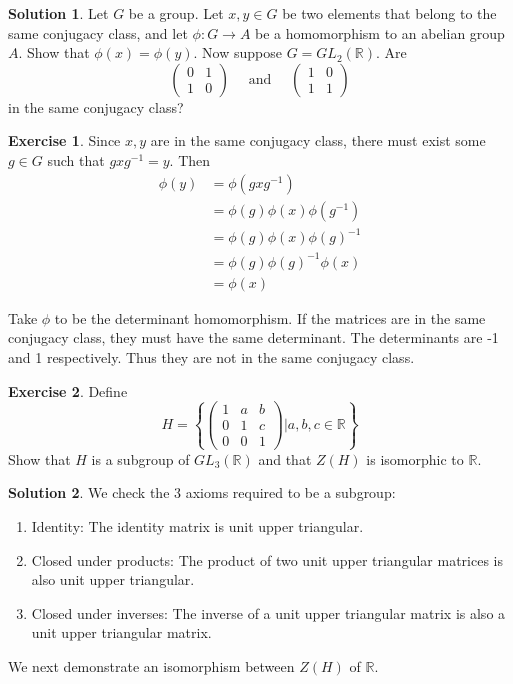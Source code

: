 \documentclass[12pt]{article}
\theoremstyle{definition}
\newcommand{\R}{\mathbb{R}}
\newtheorem{exercise}{\color{YellowOrange}Exercise}
\theoremstyle{definition}
\newtheorem{solution}{\color{Goldenrod}Solution}
\begin{document}
\begin{solution}
	Let $G$ be a group. Let $x,y \in G$ be two elements that belong to the same conjugacy class, and let $\phi : G \to A$ be a homomorphism to an abelian group $A$. Show that $\phi(x) = \phi(y)$. Now suppose $G = GL_2(\R)$. Are 
	\begin{equation}
		\begin{pmatrix}
		0 & 1 \\
		1 & 0
		\end{pmatrix}
		\quad
		\text{ and } 
		\quad 
		\begin{pmatrix}
		1 & 0 \\
		1 & 1
		\end{pmatrix}
	\end{equation}
	in the same conjugacy class?
\end{solution}
\begin{exercise}
	Since $x,y$ are in the same conjugacy class, there must exist some $g \in G$ such that $gxg^{-1} = y$. Then
	\begin{align*}
		\phi(y) &= \phi(gxg^{-1}) \\
		&= \phi(g)\phi(x)\phi(g^{-1}) \\
		&= \phi(g)\phi(x)\phi(g)^{-1} \\
		&= \phi(g)\phi(g)^{-1}\phi(x) \tag{since $A$ is abelian} \\
		&= \phi(x)
	\end{align*}

	Take $\phi$ to be the determinant homomorphism. If the matrices are in the same conjugacy class, they must have the same determinant. The determinants are -1 and 1 respectively. Thus they are not in the same conjugacy class. 
\end{exercise}

\begin{exercise}
	Define
	\begin{equation}
		H = \left\{
		\begin{pmatrix}
		1 & a & b \\
		0 & 1 & c \\
		0 & 0 & 1
		\end{pmatrix}
		\bigg\vert
		a,b,c \in \R
		\right\}
	\end{equation}
	Show that $H$ is a subgroup of $GL_3(\R)$ and that $Z(H)$ is isomorphic to $\R$. 
\end{exercise}
\begin{solution}
	We check the 3 axioms required to be a subgroup:
	\begin{enumerate}
		\item Identity: The identity matrix is unit upper triangular.
		\item Closed under products: The product of two unit upper triangular matrices is also unit upper triangular.
		\item Closed under inverses: The inverse of a unit upper triangular matrix is also a unit upper triangular matrix. 
	\end{enumerate}
	We next demonstrate an isomorphism between $Z(H)$ of $\R$. 
\end{solution}
\end{document}
